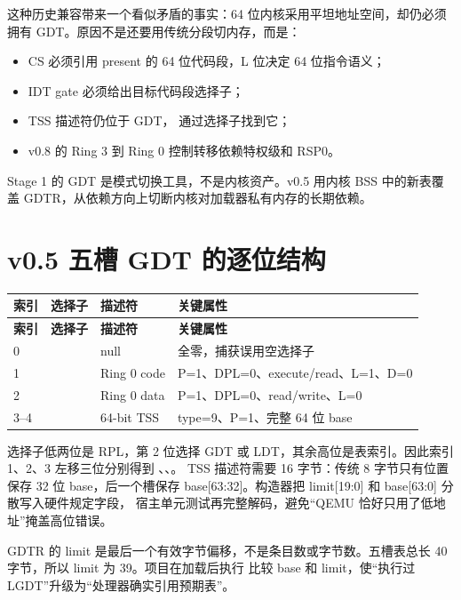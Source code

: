 这种历史兼容带来一个看似矛盾的事实：64 位内核采用平坦地址空间，却仍必须
拥有 GDT。原因不是还要用传统分段切内存，而是：

\begin{itemize}
  \item CS 必须引用 present 的 64 位代码段，L 位决定 64 位指令语义；
  \item IDT gate 必须给出目标代码段选择子；
  \item TSS 描述符仍位于 GDT， 通过选择子找到它；
  \item v0.8 的 Ring 3 到 Ring 0 控制转移依赖特权级和 RSP0。
\end{itemize}

Stage 1 的 GDT 是模式切换工具，不是内核资产。v0.5 用内核 BSS 中的新表覆盖
GDTR，从依赖方向上切断内核对加载器私有内存的长期依赖。

\section{v0.5 五槽 GDT 的逐位结构}

\begin{longtable}{L{0.10\textwidth}L{0.15\textwidth}L{0.25\textwidth}L{0.36\textwidth}}
\toprule
\textbf{索引} & \textbf{选择子} & \textbf{描述符} & \textbf{关键属性}\\
\midrule
\endfirsthead
\toprule
\textbf{索引} & \textbf{选择子} & \textbf{描述符} & \textbf{关键属性}\\
\midrule
{} &  & null & 全零，捕获误用空选择子\\
1 &  & Ring 0 code & P=1、DPL=0、execute/read、L=1、D=0\\
2 &  & Ring 0 data & P=1、DPL=0、read/write、L=0\\
3--4 &  & 64-bit TSS & type=9、P=1、完整 64 位 base\\
\bottomrule
\end{longtable}

选择子低两位是 RPL，第 2 位选择 GDT 或 LDT，其余高位是表索引。因此索引
1、2、3 左移三位分别得到 、、。
TSS 描述符需要 16 字节：传统 8 字节只有位置保存 32 位 base，后一个槽保存
base[63:32]。构造器把 limit[19:0] 和 base[63:0] 分散写入硬件规定字段，
宿主单元测试再完整解码，避免“QEMU 恰好只用了低地址”掩盖高位错误。

GDTR 的 limit 是最后一个有效字节偏移，不是条目数或字节数。五槽表总长
40 字节，所以 limit 为 39。项目在加载后执行  比较 base 和
limit，使“执行过 LGDT”升级为“处理器确实引用预期表”。

